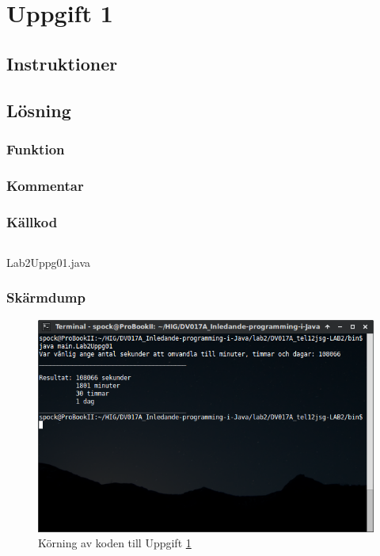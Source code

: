 \section{Uppgift 1}\label{sec:uppg01}

\subsection{Instruktioner}


\subsection{Lösning}
\subsubsection{Funktion}

\subsubsection{Kommentar}


\subsubsection{Källkod}
\inputminted[linenos]{java}{src/Lab2Uppg01.java}
\caption{Lab2Uppg01.java}
\label{src:uppg01}


\subsubsection{Skärmdump}
\begin{figure}[htbp]
    \centering
        \includegraphics[width=\linewidth]{img/01.png}
    \caption{Körning av koden till Uppgift \ref{sec:uppg01}}
    \label{fig:uppg01-screenshot}
\end{figure}

